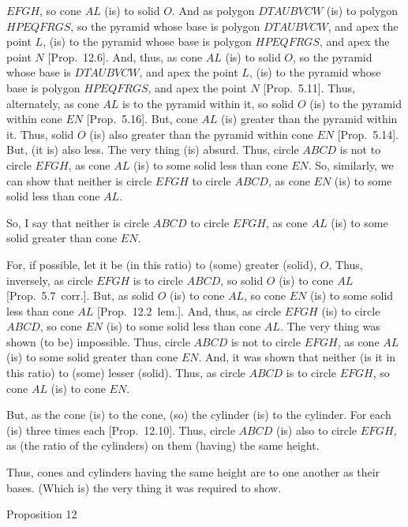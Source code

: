 $EFGH$, so cone $AL$ (is) to solid $O$. And as polygon $DTAUBVCW$ (is) to polygon $HPEQFRGS$, so the
pyramid whose base is polygon $DTAUBVCW$, and apex the point $L$, (is) to  the pyramid whose base is
polygon $HPEQFRGS$, and apex the point $N$ [Prop.~12.6]. And, thus, as cone $AL$ (is)
to solid $O$, so the pyramid whose base is $DTAUBVCW$, and apex the point $L$, (is) to  the pyramid whose base is
polygon $HPEQFRGS$, and apex the point $N$ [Prop.~5.11]. Thus, alternately, as cone $AL$ is to the pyramid within it, so solid $O$
(is) to the pyramid within cone $EN$ [Prop.~5.16]. But, cone $AL$ (is) greater than the
pyramid within it. Thus, solid $O$ (is) also greater than the pyramid within cone $EN$ [Prop.~5.14]. But,
(it is) also less. The very thing (is) absurd. Thus, circle $ABCD$ is not to circle $EFGH$, as cone $AL$
(is) to some solid less than cone $EN$. So, similarly, we can show that neither is circle $EFGH$
to circle $ABCD$, as cone $EN$ (is) to some solid less than cone $AL$.

So, I say that neither is circle $ABCD$ to circle $EFGH$, as cone $AL$ (is) to some solid greater than
cone $EN$.

For, if possible, let it be (in this ratio) to (some) greater (solid), $O$. Thus, inversely, as circle $EFGH$ is to circle
$ABCD$, so solid $O$ (is) to cone $AL$ [Prop.~5.7~corr.]. But, as solid $O$ (is) to cone $AL$, so cone $EN$ (is) to some
solid less than cone $AL$ [Prop.~12.2~lem.].  And, thus, as circle $EFGH$
(is)  to circle $ABCD$, so cone $EN$ (is) to some solid less than cone $AL$. The very thing was shown
(to be) impossible. Thus, circle $ABCD$ is not to circle $EFGH$, as cone $AL$ (is) to some solid greater than
cone $EN$. And, it was shown that neither (is it in this ratio) to (some) lesser (solid). Thus, as circle $ABCD$ is to circle
$EFGH$, so cone $AL$ (is) to cone $EN$.

But, as the cone (is) to the cone, (so) the cylinder (is) to the cylinder. For each (is) three times each [Prop.~12.10]. Thus, circle $ABCD$ (is) also to circle $EFGH$, as  (the ratio of the cylinders) on them (having) the
same height.

Thus, cones and cylinders having the same height are to one another as their bases. (Which is) the very thing
it was required to show.


\begin{center}
{\large Proposition 12}
\end{center}

